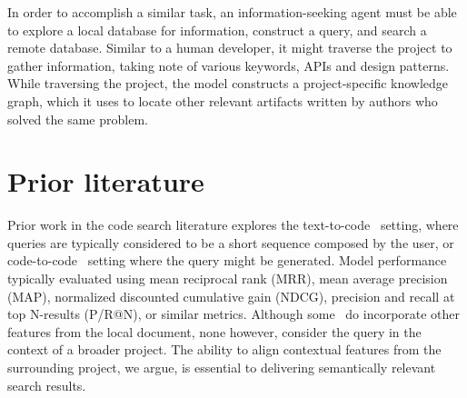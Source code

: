 \documentclass[11pt]{article}
\begin{document}
In order to accomplish a similar task, an information-seeking agent must be able to explore a local database for information, construct a query, and search a remote database. Similar to a human developer, it might traverse the project to gather information, taking note of various keywords, APIs and design patterns. While traversing the project, the model constructs a project-specific knowledge graph, which it uses to locate other relevant artifacts written by authors who solved the same problem.



\section{Prior literature}

Prior work in the code search literature explores the text-to-code~\citep{husain2019codesearchnet} setting, where queries are typically considered to be a short sequence composed by the user, or code-to-code~\citep{kim2018facoy} setting where the query might be generated. Model performance typically evaluated using mean reciprocal rank (MRR), mean average precision (MAP), normalized discounted cumulative gain (NDCG), precision and recall at top N-results (P/R@N), or similar metrics. Although some~\citep{asyrofi2020ausearch} do incorporate other features from the local document, none however, consider the query in the context of a broader project. The ability to align contextual features from the surrounding project, we argue, is essential to delivering semantically relevant search results.
\end{document}
